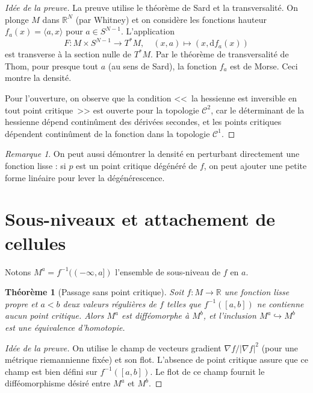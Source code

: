 \documentclass[12pt,a4paper,openany]{book}
\theoremstyle{definition}
\theoremstyle{plain}
\newtheorem{theoreme}[definition]{Théorème}
\theoremstyle{remark}
\newtheorem{remarque}[definition]{Remarque}
\newcommand{\R}{\mathbb{R}}
\newcommand{\dd}{\mathrm{d}}
\newcommand{\abs}[1]{\left|#1\right|}
\begin{document}
\begin{proof}[Idée de la preuve]
La preuve utilise le théorème de Sard et la
transversalité. On plonge $M$ dans $\R^N$ (par Whitney) et on considère les
fonctions hauteur $f_a(x) = \langle a, x \rangle$ pour $a \in S^{N-1}$.
L'application
\[
  F : M \times S^{N-1} \to T^*M, \quad (x, a) \mapsto (x, \dd f_a(x))
\]
est transverse à la section nulle de $T^*M$. Par le théorème de transversalité
de Thom, pour presque tout $a$
(au sens de Sard), la fonction $f_a$ est de Morse. Ceci montre la densité.

Pour l'ouverture, on observe que la condition <<~la hessienne est inversible en
tout point critique~>> est ouverte pour la topologie $\mathcal{C}^2$, car le
déterminant de la hessienne dépend continûment des dérivées secondes, et les
points critiques dépendent continûment de la fonction dans la topologie
$\mathcal{C}^1$.
\end{proof}

\begin{remarque}
On peut aussi démontrer la densité en perturbant directement une fonction
lisse : si $p$ est un point critique dégénéré de $f$, on peut ajouter une petite
forme linéaire pour lever la dégénérescence.
\end{remarque}

\section{Sous-niveaux et attachement de cellules}\label{sec:morse-cellules}

Notons $M^a = f^{-1}((-\infty, a])$ l'ensemble de sous-niveau
de $f$ en $a$.

\begin{theoreme}[Passage sans point critique]\label{thm:morse-sans-critique}
Soit $f : M \to \R$ une fonction lisse propre et $a < b$ deux valeurs régulières
de $f$ telles que $f^{-1}([a,b])$ ne contienne aucun point critique. Alors $M^a$
est difféomorphe à $M^b$, et l'inclusion $M^a \hookrightarrow M^b$ est une
équivalence d'homotopie.
\end{theoreme}

\begin{proof}[Idée de la preuve]
On utilise le champ de vecteurs gradient $\nabla f / \abs{\nabla f}^2$ (pour une
métrique riemannienne fixée) et son flot. L'absence de point critique assure que
ce champ est bien défini sur $f^{-1}([a,b])$. Le flot de ce champ fournit le
difféomorphisme désiré entre $M^a$ et $M^b$.
\end{proof}
\end{document}
